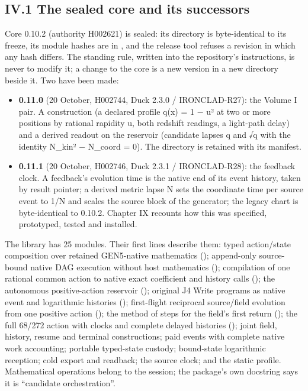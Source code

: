 \subsection{IV.1 The sealed core and its successors}\label{iv.1-the-sealed-core-and-its-successors}

Core 0.10.2 (authority H002621) is sealed: its directory  is byte-identical to its freeze, its module hashes
are in , and the release tool refuses a revision in which any hash differs. The standing rule, written into the repository's
instructions, is never to modify it; a change to the core is a new version in a new directory beside it. Two have been made:

\begin{itemize}
\tightlist
\item
  \textbf{0.11.0} (20 October, H002744, Duck 2.3.0 / IRONCLAD-R27): the Volume I pair. A  construction (a declared profile
  q(x) = 1 − u² at two or more positions by rational rapidity u, both redshift readings, a light-path delay) and a derived 
  readout on the reservoir (candidate lapses q and √q with the identity N\_kin² − N\_coord = 0). The directory  is retained with
  its manifest.
\item
  \textbf{0.11.1} (20 October, H002746, Duck 2.3.1 / IRONCLAD-R28): the feedback clock. A feedback's evolution time is the native end of its event
  history, taken by result pointer; a derived metric lapse N sets the coordinate time per source event to 1/N and scales the source block of
  the generator; the legacy chart is byte-identical to 0.10.2. Chapter IX recounts how this was specified, prototyped, tested and installed.
\end{itemize}

The library has 25 modules. Their first lines describe them: typed action/state composition over retained GEN5-native mathematics
(); append-only source-bound native DAG execution without host mathematics (); compilation of one rational common
action to native exact coefficient and history calls (); the autonomous positive-action reservoir ();
original J4 Write programs as native event and logarithmic histories (); first-flight reciprocal source/field evolution from one
positive action (); the method of steps for the field's first return (); the full 68/272 action with clocks and
complete delayed histories (); joint field, history, resume and terminal constructions; paid events with complete native work
accounting; portable typed-state custody; bound-state logarithmic reception; cold export and readback; the source clock; and the static
profile. Mathematical operations belong to the session; the package's own docstring says it is ``candidate orchestration''.

